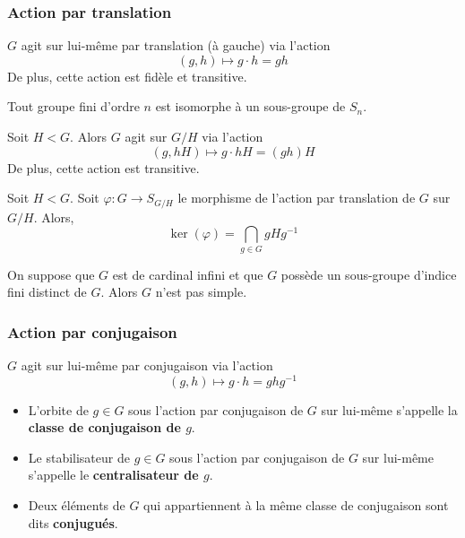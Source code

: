   \subsubsection{Action par translation}


  \begin{proposition}
    $G$ agit sur lui-même par translation (à gauche) via l'action
    \[ (g, h) \mapsto g \cdot h = gh \]
    De plus, cette action est fidèle et transitive.
  \end{proposition}

  \begin{application}
    Tout groupe fini d'ordre $n$ est isomorphe à un sous-groupe de $S_n$.
  \end{application}

  \begin{proposition}
    Soit $H < G$. Alors $G$ agit sur $G/H$ via l'action
    \[ (g, hH) \mapsto g \cdot hH = (gh)H \]
    De plus, cette action est transitive.
  \end{proposition}

  \begin{proposition}
    Soit $H < G$. Soit $\varphi : G \rightarrow S_{G/H}$ le morphisme de l'action par translation de $G$ sur $G/H$. Alors,
    \[ \ker(\varphi) = \bigcap_{g \in G} gHg^{-1} \]
  \end{proposition}


  \begin{application}
    On suppose que $G$ est de cardinal infini et que $G$ possède un sous-groupe d'indice fini distinct de $G$. Alors $G$ n'est pas simple.
  \end{application}

  \subsubsection{Action par conjugaison}


  \begin{proposition}
    $G$ agit sur lui-même par conjugaison via l'action
    \[ (g, h) \mapsto g \cdot h = ghg^{-1} \]
  \end{proposition}

  \begin{definition}
    \begin{itemize}
      \item L'orbite de $g \in G$ sous l'action par conjugaison de $G$ sur lui-même s'appelle la \textbf{classe de conjugaison de $g$}.
      \item Le stabilisateur de $g \in G$ sous l'action par conjugaison de $G$ sur lui-même s'appelle le \textbf{centralisateur de $g$}.
      \item Deux éléments de $G$ qui appartiennent à la même classe de conjugaison sont dits \textbf{conjugués}.
    \end{itemize}
  \end{definition}
  
